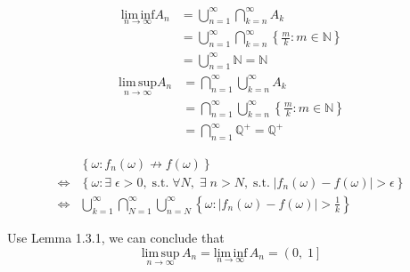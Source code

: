 \documentclass[a4paper,12pt]{article}
\begin{document}
\begin{list}{1.9.}{}
  \[
    \begin{aligned}
      \underset{n\to\infty}{\mathrm{lim\,inf}} A_n &= \bigcup\limits_{n=1}^\infty \bigcap\limits_{k=n}^\infty A_k    \\
      &= \bigcup\limits_{n=1}^\infty \bigcap\limits_{k=n}^\infty \left\{
        \frac{m}{k}:m\in\mathbb{N}
      \right\}    \\
      &= \bigcup\limits_{n=1}^\infty \mathbb{N} = \mathbb{N}
    \end{aligned}
  \]
  \[
    \begin{aligned}
      \underset{n\to\infty}{\mathrm{lim\,sup}} A_n &= \bigcap\limits_{n=1}^\infty \bigcup\limits_{k=n}^\infty A_k    \\
      &= \bigcap\limits_{n=1}^\infty \bigcup\limits_{k=n}^\infty \left\{
        \frac{m}{k}:m\in\mathbb{N}
      \right\}    \\
      &= \bigcap\limits_{n=1}^\infty\mathbb{Q^+} = \mathbb{Q^+}
    \end{aligned}
  \]
  
\item
  \[
    \begin{aligned}
      & \left\{\omega:f_n\left(\omega\right)\nrightarrow f\left(\omega\right)\right\}    \\
      \iff & \left\{\omega: \exists\;\epsilon > 0,\;\mathrm{s.t.}\;\forall N,\;\exists\;n>N,\;\mathrm{s.t.}\;
        \left|f_n\left(\omega\right) - f\left(\omega\right)\right|>\epsilon
      \right\}    \\
      \iff & \bigcup\limits_{k=1}^\infty\bigcap\limits_{N=1}^\infty\bigcup\limits_{n=N}^\infty
      \left\{
        \omega:\left|f_n\left(\omega\right) - f\left(\omega\right)\right| > \frac{1}{k}
      \right\}
    \end{aligned}
  \]
  
\item
  Use Lemma 1.3.1, we can conclude that
  \[
    \underset{n\to\infty}{\mathrm{lim\,sup}}\,A_n = \underset{n\to\infty}{\mathrm{lim\,inf}}\,A_n
    = \left(0,\;1\right]
  \]
\item 



  
\end{list}











\clearpage
\appendix
\end{document}
